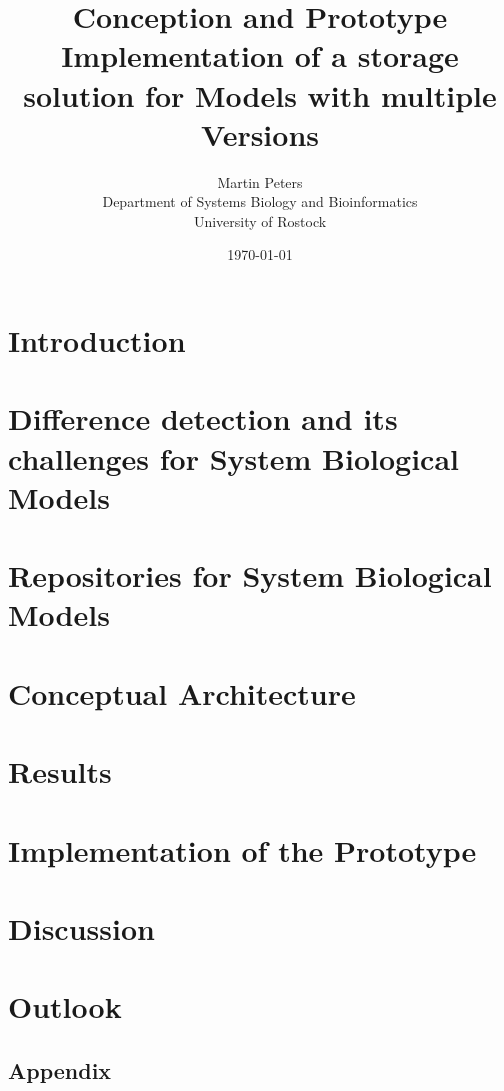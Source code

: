 \documentclass[12pt, a4paper, titlepage]{book}
\title{Conception and Prototype Implementation of a storage solution for Models with multiple Versions}
\author{Martin Peters\\[12pt]
	\small Department of Systems Biology and Bioinformatics\\
	\small University of Rostock}
\date{\today}
\begin{document}
	\maketitle
	\tableofcontents
	
	\chapter{Introduction}
	
	
	\chapter{Difference detection and its challenges for System Biological Models}
	
	
	\chapter{Repositories for System Biological Models}
	
	
	\chapter{Conceptual Architecture}
	
	
	\chapter{Results}
	
	
	\chapter{Implementation of the Prototype}
	
	
	\chapter{Discussion}
	
	
	\chapter{Outlook}
	
	
	
	
	
	\begin{appendix}
		\listoffigures
		
		\chapter*{Appendix}
	\end{appendix}
\end{document}
